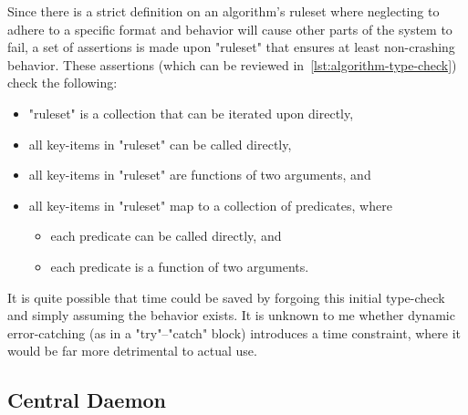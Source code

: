 Since there is a strict definition on an algorithm's ruleset
  where neglecting to adhere to a specific format and behavior
  will cause other parts of the system to fail,
  a set of assertions is made upon "ruleset" that ensures at least non-crashing behavior.
These assertions (which can be reviewed in~\autoref{lst:algorithm-type-check}) check the following:
\begin{itemize}
\item "ruleset" is a collection that can be iterated upon directly,
\item all key-items in "ruleset" can be called directly,
\item all key-items in "ruleset" are functions of two arguments, and
\item all key-items in "ruleset" map to a collection of predicates, where
  \begin{itemize}
  \item each predicate can be called directly, and
  \item each predicate is a function of two arguments.
  \end{itemize}
\end{itemize}
It is quite possible that time could be saved by
  forgoing this initial type-check and simply assuming the behavior exists.
It is unknown to me whether dynamic error-catching (as in a "try"--"catch" block)
  introduces a time constraint, where it would be far more detrimental to actual use.


\subsection{Central Daemon}
\label{sec:logic-repr:daemon}

